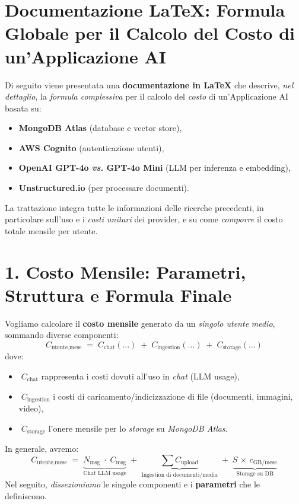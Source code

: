 \documentclass[a4paper,10pt]{article}
\begin{document}
\section*{Documentazione \LaTeX: Formula Globale per il Calcolo del Costo di un’Applicazione AI}

\noindent
Di seguito viene presentata una \textbf{documentazione in \LaTeX} che descrive, \emph{nel dettaglio}, la \emph{formula complessiva} per il calcolo del \emph{costo} di un’Applicazione AI basata su:
\begin{itemize}
    \item \textbf{MongoDB Atlas} (database e vector store),
    \item \textbf{AWS Cognito} (autenticazione utenti),
    \item \textbf{OpenAI GPT-4o \textit{vs.} GPT-4o Mini} (LLM per inferenza e embedding),
    \item \textbf{Unstructured.io} (per processare documenti).
\end{itemize}

La trattazione integra tutte le informazioni delle ricerche precedenti, in particolare sull’uso e i \emph{costi unitari} dei provider, e su come \emph{comporre} il costo totale mensile per utente.

\section*{1. Costo Mensile: Parametri, Struttura e Formula Finale}

Vogliamo calcolare il \textbf{costo mensile} generato da un \emph{singolo utente} \textit{medio}, sommando diverse componenti:
\[
C_{\text{utente,mese}}
\;=\;
C_{\text{chat}}(\dots)
\;+\;
C_{\text{ingestion}}(\dots)
\;+\;
C_{\text{storage}}(\dots)
\]
dove:
\begin{itemize}
    \item \(\;C_{\text{chat}}\) rappresenta i costi dovuti all’uso in \emph{chat} (LLM usage),
    \item \(\;C_{\text{ingestion}}\) i costi di caricamento/indicizzazione di file (documenti, immagini, video),
    \item \(\;C_{\text{storage}}\) l’onere mensile per lo \emph{storage} su \emph{MongoDB Atlas}.
\end{itemize}

In generale, avremo:
\[
\boxed{
C_{\text{utente,mese}}
\;=\;
\underbrace{N_{\text{msg}} \;\cdot\; C_{\text{msg}}}_{\text{Chat LLM usage}}
\;+\;
\underbrace{\sum C_{\text{upload}}}_{\text{Ingestion di documenti/media}}
\;+\;
\underbrace{S\,\times\,c_{\text{GB/mese}}}_{\text{Storage su DB}}
}
\]
Nel seguito, \emph{dissezioniamo} le singole componenti e i \textbf{parametri} che le definiscono.
\end{document}
